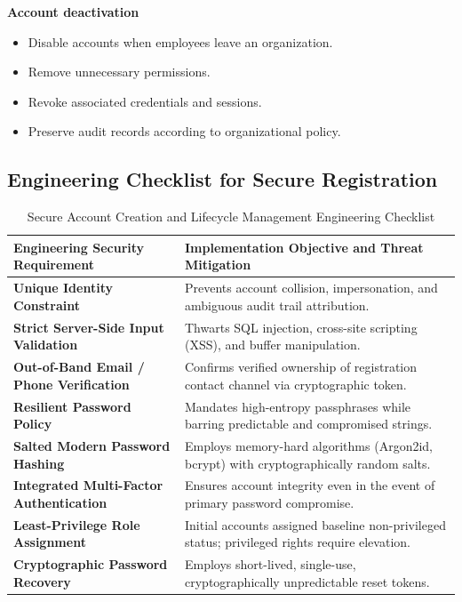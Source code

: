 \textbf{Account deactivation}

\begin{itemize}
\item Disable accounts when employees leave an organization.
\item Remove unnecessary permissions.
\item Revoke associated credentials and sessions.
\item Preserve audit records according to organizational policy.
\end{itemize}

\subsection{Engineering Checklist for Secure Registration}

\begin{table}[htbp]
\centering
\caption{Secure Account Creation and Lifecycle Management Engineering Checklist}
\label{tab:account_creation_checklist}
\begin{tabularx}{\textwidth}{p{4.5cm} X}
\toprule
\textbf{Engineering Security Requirement} & \textbf{Implementation Objective and Threat Mitigation} \\
\midrule
\textbf{Unique Identity Constraint} & Prevents account collision, impersonation, and ambiguous audit trail attribution. \\
\textbf{Strict Server-Side Input Validation} & Thwarts SQL injection, cross-site scripting (XSS), and buffer manipulation. \\
\textbf{Out-of-Band Email / Phone Verification} & Confirms verified ownership of registration contact channel via cryptographic token. \\
\textbf{Resilient Password Policy} & Mandates high-entropy passphrases while barring predictable and compromised strings. \\
\textbf{Salted Modern Password Hashing} & Employs memory-hard algorithms (Argon2id, bcrypt) with cryptographically random salts. \\
\textbf{Integrated Multi-Factor Authentication} & Ensures account integrity even in the event of primary password compromise. \\
\textbf{Least-Privilege Role Assignment} & Initial accounts assigned baseline non-privileged status; privileged rights require elevation. \\
\textbf{Cryptographic Password Recovery} & Employs short-lived, single-use, cryptographically unpredictable reset tokens. \\

\end{tabularx}
\end{table}
